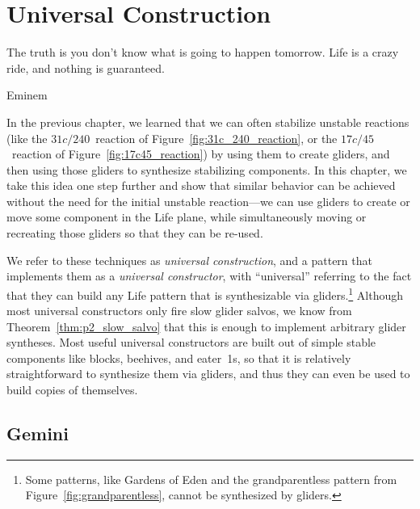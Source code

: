 
\renewcommand{\chapterfolder}{universal_construction/}
\chapter{Universal Construction}\label{chp:universal_construction}


\vspace*{-0.4in}
\epigraph{The truth is you don't know what is going to happen tomorrow. Life is a crazy ride, and nothing is guaranteed.}{Eminem}
\vspace*{0.4in}


\noindent In the previous chapter, we learned that we can often stabilize unstable reactions (like the $31c/240$~reaction of Figure~\ref{fig:31c_240_reaction}, or the $17c/45$~reaction of Figure~\ref{fig:17c45_reaction}) by using them to create gliders, and then using those gliders to synthesize stabilizing components. In this chapter, we take this idea one step further and show that similar behavior can be achieved without the need for the initial unstable reaction---we can use gliders to create or move some component in the Life plane, while simultaneously moving or recreating those gliders so that they can be re-used.

We refer to these techniques as \emph{universal construction}, and a pattern that implements them as a \emph{universal constructor}, with ``universal'' referring to the fact that they can build any Life pattern that is synthesizable via gliders.\footnote{Some patterns, like Gardens of Eden and the grandparentless pattern from Figure~\ref{fig:grandparentless}, cannot be synthesized by gliders.} Although most universal constructors only fire slow glider salvos, we know from Theorem~\ref{thm:p2_slow_salvo} that this is enough to implement arbitrary glider syntheses. Most useful universal constructors are built out of simple stable components like blocks, beehives, and eater~1s, so that it is relatively straightforward to synthesize them via gliders, and thus they can even be used to build copies of themselves.


\section{Gemini}\label{sec:gemini}

